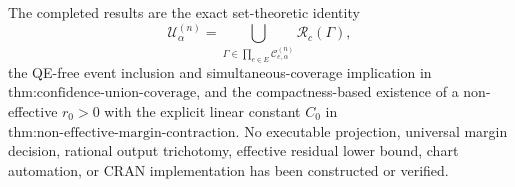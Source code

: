 The completed results are the exact set-theoretic identity
\[
\mathcal U^{(n)}_\alpha
=\bigcup_{\Gamma\in\prod_{e\in E}\mathcal C^{(n)}_{e,\alpha}}
\mathcal R_c(\Gamma),
\]
the QE-free event inclusion and simultaneous-coverage implication in \(\text{thm:confidence-union-coverage}\), and the compactness-based existence of a non-effective \(r_0>0\) with the explicit linear constant \(C_0\) in \(\text{thm:non-effective-margin-contraction}\). No executable projection, universal margin decision, rational output trichotomy, effective residual lower bound, chart automation, or CRAN implementation has been constructed or verified.